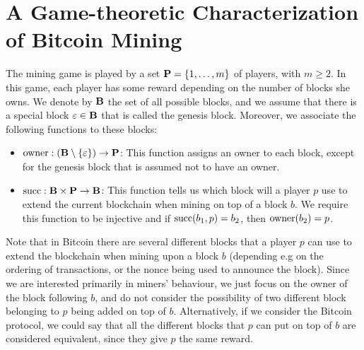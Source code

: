\documentclass{article}
\begin{document}


\section{A Game-theoretic Characterization of Bitcoin Mining}

The mining game is played by a set $\mathbf{P} = \{1, \ldots, m\}$ of players, with $m \geq 2$. In this game, each player has some reward depending on the number of blocks she owns. We denote by $\mathbf{B}$ the set of all possible blocks, and we assume that there is a special block $\varepsilon \in \mathbf{B}$ that is called the genesis block. Moreover, we associate the following functions to these blocks:
\begin{itemize}
\item $\text{owner} : (\mathbf{B} \setminus \{\varepsilon\}) \to \mathbf{P}$: This function assigns an owner to each block, except for the genesis block that is assumed not to have an owner.

\item $\text{succ}: \mathbf{B} \times \mathbf{P} \to \mathbf{B}$: This function tells us which block will a player $p$ use to extend the current blockchain when mining on top of a block $b$. We require this function to be injective and if $\text{succ}(b_1,p)=b_2$, then $\text{owner}(b_2)=p$.
\end{itemize}

Note that in Bitcoin there are several different blocks that a player $p$ can use to extend the blockchain when mining upon a block $b$ (depending e.g on the ordering of transactions, or the nonce being used to announce the block). Since we are interested primarily in miners' behaviour, we just focus on the owner of the block following $b$, and do not consider the possibility of two different block belonging to $p$ being added on top of $b$. Alternatively, if we consider the Bitcoin protocol, we could say that all the different blocks that $p$ can put on top of $b$ are considered equivalent, since they give $p$ the same reward. %
\end{document}
